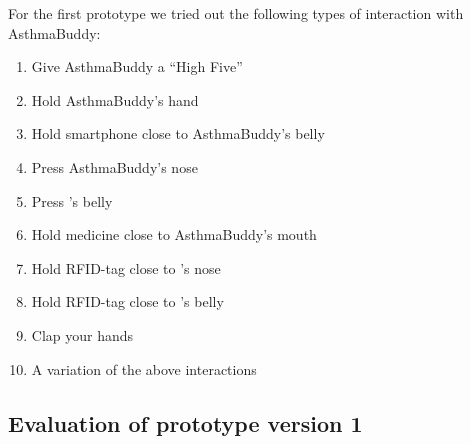 For the first prototype we tried out the following types of interaction with AsthmaBuddy:
\begin{enumerate}
	\item{Give AsthmaBuddy a ``High Five''}
	\item{Hold AsthmaBuddy's hand}
	\item{Hold smartphone close to AsthmaBuddy's belly}
	\item{Press AsthmaBuddy's nose}
	\item{Press \buddy{}'s belly}
	\item{Hold medicine close to AsthmaBuddy's mouth}
	\item{Hold RFID-tag close to \buddy{}'s nose}
	\item{Hold RFID-tag close to \buddy{}'s belly}
	\item{Clap your hands}
	\item{A variation of the above interactions}
\end{enumerate}


\subsection{Evaluation of prototype version 1}

